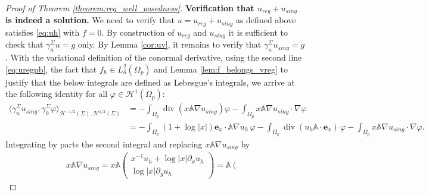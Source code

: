 \documentclass[report]{elsarticle}
\numberwithin{theorem}{section}
\renewcommand{\vec}[1]{\mathbf{#1}}
\begin{document}
\begin{proof}[Proof of Theorem \ref{theorem:reg_well_posedness}]
	
	\textbf{Verification that $u_{reg}+u_{sing}$ is indeed a solution. } We need to verify that $u=u_{reg}+u_{sing}$ as defined above satisfies \eqref{eq:uh} with $f=0$. By construction of $u_{reg}$ and $u_{sing}$ it is sufficient to check that $\gamma_n^{\Sigma}u=g$ only. By Lemma \ref{cor:uv}, it remains to verify that $\gamma_n^{\Sigma}u_{sing}=g$. With the  variational definition of the conormal derivative,  using the second line \eqref{eq:uregpb}, the fact that $f_h\in L^2_{\delta}(\Omega_p)$ and Lemma \ref{lem:f_belongs_vreg} to justify that the below integrals are defined as Lebesgue's integrals, we arrive at the following identity for all $\varphi\in \mathcal{H}^1(\Omega_p)$:
	\begin{align*}
		\langle \gamma_n^{\Sigma}u_{sing}, \gamma_0^{\Sigma}\varphi\rangle_{\mathcal{H}^{-1/2}(\Sigma), \mathcal{H}^{1/2}(\Sigma)}&= -\int_{\Omega_p}\operatorname{div}(x\mathbb{A}\nabla u_{sing}) \varphi - \int_{\Omega_p}x\mathbb{A}\nabla u_{sing}\cdot \nabla \varphi \\
		&=-\int_{\Omega_p}(1+\log|x|)\vec{e}_x\cdot \mathbb{A}\nabla u_h\, \varphi -\int_{\Omega_p}\operatorname{div}(u_h\mathbb{A}\cdot \vec{e}_x)\, \varphi-\int_{\Omega_p}x\mathbb{A}\nabla u_{sing}\cdot \nabla \varphi.
	\end{align*}
	Integrating by parts the second integral and replacing $x\mathbb{A}\nabla u_{sing}$ by
	\begin{align*}
		x \mathbb{A}\nabla u_{sing}= x \mathbb{A}\left(\begin{matrix}
			x^{-1}u_h+\log|x|\partial_x u_h \\
			\log|x|\partial_y u_h
		\end{matrix}\right)=\mathbb{A}\left(\begin{matrix}

\end{matrix}
\end{align*}
\end{proof}
\end{document}
